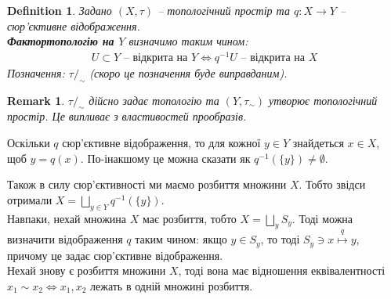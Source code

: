 \documentclass[a4paper, 10pt]{article}
\theoremstyle{theoremdd}
\newtheorem{definition}[theorem]{Definition}
\newtheorem{remark}[theorem]{Remark}
\begin{document}
\begin{definition}
Задано $(X,\tau)$ -- топологічний простір та $q \colon X \to Y$ -- сюр'єктивне відображення.\\
\textbf{Фактортопологію на $Y$} визначимо таким чином:
\begin{align*}
U \subset Y \text{ -- відкрита на } Y \iff q^{-1}U \text{ -- відкрита на } X
\end{align*}
Позначення: $\tau/_\sim$ (скоро це позначення буде виправданим).
\end{definition}

\begin{remark}
$\tau/_{\sim}$ дійсно задає топологію та $(Y,\tau_\sim)$ утворює топологічний простір. Це випливає з властивостей прообразів.
\end{remark}
\noindent
Оскільки $q$ сюр'єктивне відображення, то для кожної $y \in Y$ знайдеться $x \in X$, щоб $y = q(x)$. По-інакшому це можна сказати як $q^{-1}(\{y\}) \neq \emptyset$.
\begin{figure}[H]
\centering
{}
\end{figure}
\noindent Також в силу сюр'єктивності ми маємо розбиття множини $X$. Тобто звідси отримали $X = \displaystyle\bigsqcup_{y \in Y} q^{-1}(\{y\})$.
\bigskip \\
\noindent Навпаки, нехай множина $X$ має розбиття, тобто $X = \displaystyle\bigsqcup_{y} S_y$. Тоді можна визначити відображення $q$ таким чином: якщо $y \in S_y$, то тоді $S_y \ni x \overset{q}{\mapsto} y$, причому це задає сюр'єктивне відображення.
\bigskip \\
Нехай знову є розбиття множини $X$, тоді вона має відношення еквівалентності $x_1 \sim x_2 \iff x_1,x_2$ лежать в одній множині розбиття.\\
\end{document}
